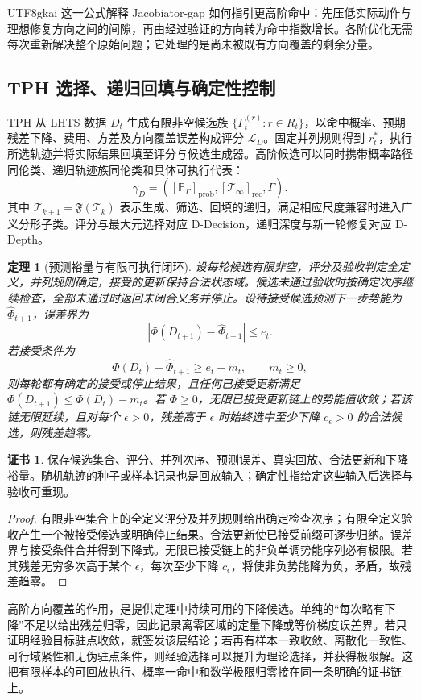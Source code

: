 \documentclass[11pt,a4paper]{article}
\theoremstyle{plain}
\newtheorem{theorem}{定理}[section]
\theoremstyle{definition}
\newtheorem*{certificate}{证书}
\theoremstyle{remark}
\begin{document}
\begin{CJK*}{UTF8}{gkai}
这一公式解释 Jacobiator-gap 如何指引更高阶命中：先压低实际动作与理想修复方向之间的间隙，再由经过验证的方向转为命中指数增长。各阶优化无需每次重新解决整个原始问题；它处理的是尚未被既有方向覆盖的剩余分量。

\subsection{TPH 选择、递归回填与确定性控制}

TPH 从 LHTS 数据 $D_t$ 生成有限非空候选族 $\{\Gamma_t^{(r)}:r\in R_t\}$，以命中概率、预期残差下降、费用、方差及方向覆盖误差构成评分 $\mathcal L_D$。固定并列规则得到 $r_t^*$，执行所选轨迹并将实际结果回填至评分与候选生成器。高阶候选可以同时携带概率路径同伦类、递归轨迹族同伦类和具体可执行代表：
\[
 \gamma_D=([\mathbb P_\Gamma]_{\mathrm{prob}},
           [\mathcal T_\infty]_{\mathrm{rec}},\Gamma).
\]
其中 $\mathcal T_{k+1}=\mathfrak F(\mathcal T_k)$ 表示生成、筛选、回填的递归，满足相应尺度兼容时进入广义分形子类。评分与最大元选择对应 D-Decision，递归深度与新一轮修复对应 D-Depth。

\begin{theorem}[预测裕量与有限可执行闭环]
\label{ss:tph}
设每轮候选有限非空，评分及验收判定全定义，并列规则确定，接受的更新保持合法状态域。候选未通过验收时按确定次序继续检查，全部未通过时返回未闭合义务并停止。设待接受候选预测下一步势能为 $\widehat\Phi_{t+1}$，误差界为
\[
 |\Phi(D_{t+1})-\widehat\Phi_{t+1}|\le e_t.
\]
若接受条件为
\[
 \Phi(D_t)-\widehat\Phi_{t+1}\ge e_t+m_t,\qquad m_t\ge0,
\]
则每轮都有确定的接受或停止结果，且任何已接受更新满足 $\Phi(D_{t+1})\le\Phi(D_t)-m_t$。若 $\Phi\ge0$，无限已接受更新链上的势能值收敛；若该链无限延续，且对每个 $\epsilon>0$，残差高于 $\epsilon$ 时始终选中至少下降 $c_\epsilon>0$ 的合法候选，则残差趋零。
\end{theorem}
\begin{certificate}
保存候选集合、评分、并列次序、预测误差、真实回放、合法更新和下降裕量。随机轨迹的种子或样本记录也是回放输入；确定性指给定这些输入后选择与验收可重现。
\end{certificate}
\begin{proof}
有限非空集合上的全定义评分及并列规则给出确定检查次序；有限全定义验收产生一个被接受候选或明确停止结果。合法更新使已接受前缀可逐步归纳。误差界与接受条件合并得到下降式。无限已接受链上的非负单调势能序列必有极限。若其残差无穷多次高于某个 $\epsilon$，每次至少下降 $c_\epsilon$，将使非负势能降为负，矛盾，故残差趋零。
\end{proof}

高阶方向覆盖的作用，是提供定理中持续可用的下降候选。单纯的“每次略有下降”不足以给出残差归零，因此记录离零区域的定量下降或等价梯度误差界。若只证明经验目标驻点收敛，就签发该层结论；若再有样本一致收敛、离散化一致性、可行域紧性和无伪驻点条件，则经验选择可以提升为理论选择，并获得极限解。这把有限样本的可回放执行、概率一命中和数学极限归零接在同一条明确的证书链上。


\end{CJK*}
\end{document}
